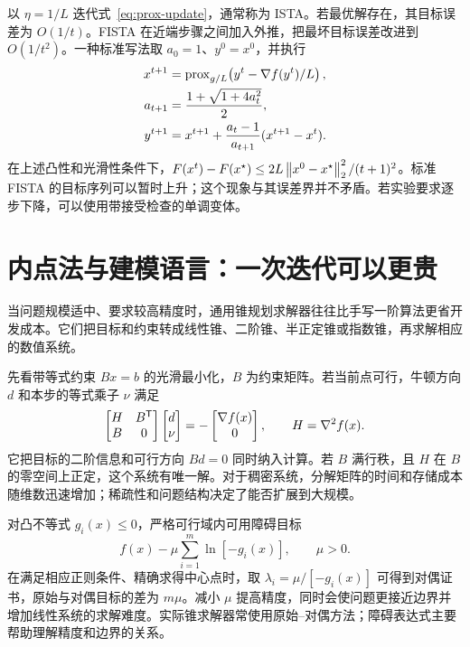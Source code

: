 以 $\eta=1/L$ 迭代式~\eqref{eq:prox-update}，通常称为 ISTA。若最优解存在，其目标误差为 $O(1/t)$。FISTA 在近端步骤之间加入外推，把最坏目标误差改进到 $O(1/t^2)$\cite{beck2009}。一种标准写法取 $a_0=1$、$y^0=x^0$，并执行
\begin{align}
 x^{t+1}&=\operatorname{prox}_{g/L}\!\left(y^t-\nabla f(y^t)/L\right),\\
 a_{t+1}&=\frac{1+\sqrt{1+4a_t^2}}2,\\
 y^{t+1}&=x^{t+1}+\frac{a_t-1}{a_{t+1}}(x^{t+1}-x^t).
\end{align}
在上述凸性和光滑性条件下，$F(x^t)-F(x^\star)\le 2L\left\lVert x^0-x^\star\right\rVert_2^2/(t+1)^2$。标准 FISTA 的目标序列可以暂时上升；这个现象与其误差界并不矛盾。若实验要求逐步下降，可以使用带接受检查的单调变体。

\section{内点法与建模语言：一次迭代可以更贵}
当问题规模适中、要求较高精度时，通用锥规划求解器往往比手写一阶算法更省开发成本。它们把目标和约束转成线性锥、二阶锥、半正定锥或指数锥，再求解相应的数值系统。

先看带等式约束 $Bx=b$ 的光滑最小化，$B$ 为约束矩阵。若当前点可行，牛顿方向 $d$ 和本步的等式乘子 $\nu$ 满足
\begin{equation}
 \begin{bmatrix}H&B^\mathsf T\\B&0\end{bmatrix}
 \begin{bmatrix}d\\\nu\end{bmatrix}
 =-\begin{bmatrix}\nabla f(x)\\0\end{bmatrix},
 \qquad H=\nabla^2 f(x).
 \label{eq:newton-kkt}
\end{equation}
它把目标的二阶信息和可行方向 $Bd=0$ 同时纳入计算。若 $B$ 满行秩，且 $H$ 在 $B$ 的零空间上正定，这个系统有唯一解。对于稠密系统，分解矩阵的时间和存储成本随维数迅速增加；稀疏性和问题结构决定了能否扩展到大规模。

对凸不等式 $g_i(x)\le0$，严格可行域内可用障碍目标
\begin{equation}
 f(x)-\mu\sum_{i=1}^m\ln[-g_i(x)],\qquad \mu>0.
\end{equation}
在满足相应正则条件、精确求得中心点时，取 $\lambda_i=\mu/[-g_i(x)]$ 可得到对偶证书，原始与对偶目标的差为 $m\mu$。减小 $\mu$ 提高精度，同时会使问题更接近边界并增加线性系统的求解难度。实际锥求解器常使用原始--对偶方法；障碍表达式主要帮助理解精度和边界的关系\cite{boyd2004}。


